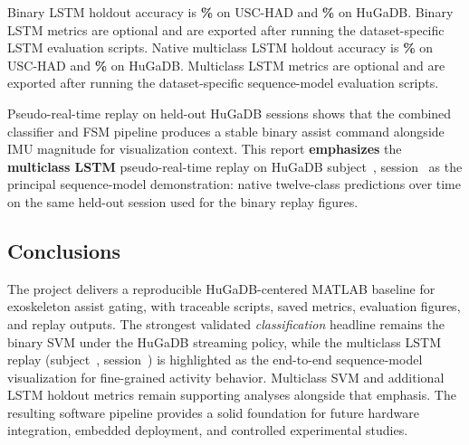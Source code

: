 \ifnum{}
Binary LSTM holdout accuracy is \textbf{\LstmBinaryHoldoutAccUsc\%} on USC-HAD and \textbf{\LstmBinaryHoldoutAccHuGa\%} on HuGaDB.
\else
Binary LSTM metrics are optional and are exported after running the dataset-specific LSTM evaluation scripts.
\fi
\ifnum{}
Native multiclass LSTM holdout accuracy is \textbf{\LstmMulticlassHoldoutAccUsc\%} on USC-HAD and \textbf{\LstmMulticlassHoldoutAccHuGa\%} on HuGaDB.
\else
Multiclass LSTM metrics are optional and are exported after running the dataset-specific sequence-model evaluation scripts.
\fi

Pseudo-real-time replay on held-out HuGaDB sessions shows that the combined classifier and FSM pipeline produces a stable binary assist command alongside IMU magnitude for visualization context. This report \textbf{emphasizes} the \textbf{multiclass LSTM} pseudo-real-time replay on HuGaDB subject~\ReplayHuGaDBSubject{}, session~\ReplayHuGaDBSession{} as the principal sequence-model demonstration: native twelve-class predictions over time on the same held-out session used for the binary replay figures.

\subsection*{Conclusions}
The project delivers a reproducible HuGaDB-centered MATLAB baseline for exoskeleton assist gating, with traceable scripts, saved metrics, evaluation figures, and replay outputs. The strongest validated \emph{classification} headline remains the binary SVM under the HuGaDB streaming policy, while the multiclass LSTM replay (subject~\ReplayHuGaDBSubject{}, session~\ReplayHuGaDBSession{}) is highlighted as the end-to-end sequence-model visualization for fine-grained activity behavior. Multiclass SVM and additional LSTM holdout metrics remain supporting analyses alongside that emphasis. The resulting software pipeline provides a solid foundation for future hardware integration, embedded deployment, and controlled experimental studies.
